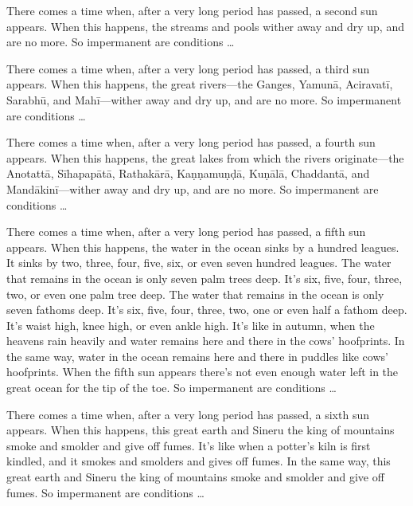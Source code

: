 \documentclass[12pt,openany]{book}%
\begin{document}
There comes a time when, after a very long period has passed, a second sun appears. When this happens, the streams and pools wither away and dry up, and are no more. So impermanent are conditions … 

There comes a time when, after a very long period has passed, a third sun appears. When this happens, the great rivers—the Ganges, \textsanskrit{Yamunā}, \textsanskrit{Aciravatī}, \textsanskrit{Sarabhū}, and \textsanskrit{Mahī}—wither away and dry up, and are no more. So impermanent are conditions … 

There comes a time when, after a very long period has passed, a fourth sun appears. When this happens, the great lakes from which the rivers originate—the \textsanskrit{Anotattā}, \textsanskrit{Sīhapapātā}, \textsanskrit{Rathakārā}, \textsanskrit{Kaṇṇamuṇḍā}, \textsanskrit{Kuṇālā}, \textsanskrit{Chaddantā}, and \textsanskrit{Mandākinī}—wither away and dry up, and are no more. So impermanent are conditions … 

There comes a time when, after a very long period has passed, a fifth sun appears. When this happens, the water in the ocean sinks by a hundred leagues. It sinks by two, three, four, five, six, or even seven hundred leagues. The water that remains in the ocean is only seven palm trees deep. It’s six, five, four, three, two, or even one palm tree deep. The water that remains in the ocean is only seven fathoms deep. It’s six, five, four, three, two, one or even half a fathom deep. It’s waist high, knee high, or even ankle high. It’s like in autumn, when the heavens rain heavily and water remains here and there in the cows’ hoofprints. In the same way, water in the ocean remains here and there in puddles like cows’ hoofprints. When the fifth sun appears there’s not even enough water left in the great ocean for the tip of the toe. So impermanent are conditions … 

There comes a time when, after a very long period has passed, a sixth sun appears. When this happens, this great earth and Sineru the king of mountains smoke and smolder and give off fumes. It’s like when a potter’s kiln is first kindled, and it smokes and smolders and gives off fumes. In the same way, this great earth and Sineru the king of mountains smoke and smolder and give off fumes. So impermanent are conditions … 
\end{document}

